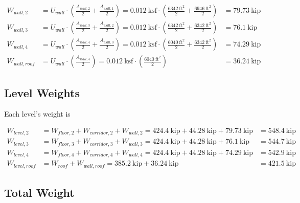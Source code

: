 \documentclass[11pt]{article}
\begin{document}
    \begin{equation*}
\begin{aligned}
W_{wall,2} &= U_{wall} \cdot \left( \frac{ A_{wall,2} }{ 2 } + \frac{ A_{wall,1} }{ 2 } \right)  = 0.012\ \mathrm{ksf} \cdot \left( \frac{ 6342\ \mathrm{ft}^{2} }{ 2 } + \frac{ 6946\ \mathrm{ft}^{2} }{ 2 } \right) &= 79.73\ \mathrm{kip}  
\\
W_{wall,3} &= U_{wall} \cdot \left( \frac{ A_{wall,3} }{ 2 } + \frac{ A_{wall,2} }{ 2 } \right)  = 0.012\ \mathrm{ksf} \cdot \left( \frac{ 6342\ \mathrm{ft}^{2} }{ 2 } + \frac{ 6342\ \mathrm{ft}^{2} }{ 2 } \right) &= 76.1\ \mathrm{kip}  
\\
W_{wall,4} &= U_{wall} \cdot \left( \frac{ A_{wall,4} }{ 2 } + \frac{ A_{wall,3} }{ 2 } \right)  = 0.012\ \mathrm{ksf} \cdot \left( \frac{ 6040\ \mathrm{ft}^{2} }{ 2 } + \frac{ 6342\ \mathrm{ft}^{2} }{ 2 } \right) &= 74.29\ \mathrm{kip}  
\\
W_{wall,roof} &= U_{wall} \cdot \left( \frac{ A_{wall,4} }{ 2 } \right)  = 0.012\ \mathrm{ksf} \cdot \left( \frac{ 6040\ \mathrm{ft}^{2} }{ 2 } \right) &= 36.24\ \mathrm{kip}  
\end{aligned}
\end{equation*}

    
    \subsection{Level Weights}\label{level-weights}

    Each level's weight is

    \begin{equation*}
\begin{aligned}
W_{level,2} &= W_{floor,2} + W_{corridor,2} + W_{wall,2}  = 424.4\ \mathrm{kip} + 44.28\ \mathrm{kip} + 79.73\ \mathrm{kip} &= 548.4\ \mathrm{kip}  
\\
W_{level,3} &= W_{floor,3} + W_{corridor,3} + W_{wall,3}  = 424.4\ \mathrm{kip} + 44.28\ \mathrm{kip} + 76.1\ \mathrm{kip} &= 544.7\ \mathrm{kip}  
\\
W_{level,4} &= W_{floor,4} + W_{corridor,4} + W_{wall,4}  = 424.4\ \mathrm{kip} + 44.28\ \mathrm{kip} + 74.29\ \mathrm{kip} &= 542.9\ \mathrm{kip}  
\\
W_{level,roof} &= W_{roof} + W_{wall,roof}  = 385.2\ \mathrm{kip} + 36.24\ \mathrm{kip} &= 421.5\ \mathrm{kip}  
\end{aligned}
\end{equation*}

    
    \subsection{Total Weight}\label{total-weight}
\end{document}

